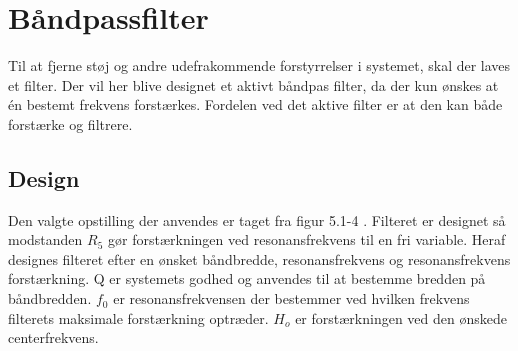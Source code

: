\section{Båndpassfilter}\label{sec:filter}
Til at fjerne støj og andre udefrakommende forstyrrelser i systemet, skal der laves et filter.
Der vil her blive designet et aktivt båndpas filter, da der kun ønskes at én bestemt frekvens forstærkes.
Fordelen ved det aktive filter er at den kan både forstærke og filtrere.

\subsection{Design}
Den valgte opstilling der anvendes er taget fra figur 5.1-4 \cite[side. 208]{Huelsman1993}.
Filteret er designet så modstanden $R_5$ gør forstærkningen ved resonansfrekvens til en fri variable.
Heraf designes filteret efter en ønsket båndbredde, resonansfrekvens og resonansfrekvens forstærkning. Q er systemets godhed og anvendes til at bestemme bredden på båndbredden. 
$f_0$ er resonansfrekvensen der bestemmer ved hvilken frekvens filterets maksimale forstærkning optræder.
$H_o$ er forstærkningen ved den ønskede centerfrekvens.
